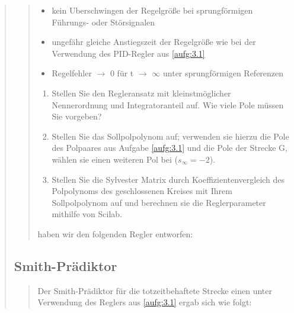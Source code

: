 \begin{quote}
\begin{quote}
        \begin{itemize}
            
            \item kein Uberschwingen der Regelgröße bei sprungförmigen Führungs- oder Störsignalen
            
            \item ungefähr gleiche Anstiegszeit der Regelgröße wie bei der Verwendung des PID-Regler aus
            \ref{aufg:3.1}
            
            \item Regelfehler $\to$ 0 für t $\to$ $\infty$ unter sprungförmigen Referenzen
        
        \end{itemize}
        \vspace{1em}
        
        \begin{enumerate}
            
            \item Stellen Sie den Regleransatz mit kleinstmöglicher Nennerordnung und Integratoranteil auf. Wie viele Pole
            müssen Sie vorgeben?\\
            
            \item Stellen Sie das Sollpolpolynom auf; verwenden sie hierzu die Pole des Polpaares aus Aufgabe \ref{aufg:3.1}
            und die Pole der Strecke G, wählen sie einen weiteren Pol bei ($s_\infty = -2$).\\
            
            \item Stellen Sie die Sylvester Matrix durch Koeffizientenvergleich des Polpolynoms des geschlossenen Kreises
            mit Ihrem Sollpolpolynom auf und berechnen sie die Reglerparameter mithilfe von Scilab.\\
        
        \end{enumerate}
        
        
        haben wir den folgenden Regler entworfen:
        
        
        
    \end{quote}
    
    
    
    \subsection{Smith-Prädiktor}
    \begin{quote}
        
        Der Smith-Prädiktor für die totzeitbehaftete Strecke einen unter Verwendung des Reglers aus \ref{aufg:3.1} ergab sich wie folgt:
        
        
    \end{quote}
    
\end{quote} %



